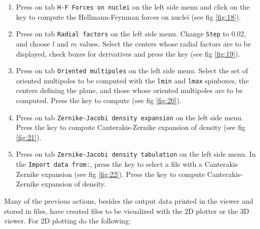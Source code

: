 \documentclass[a4paper,10pt]{article}
\begin{document}
\begin{enumerate}
\item Press on tab \texttt{H-F Forces on nuclei} on the left side menu and
click on the \exec key to compute the Hellmann-Feynman forces on nuclei (see fig
\ref{fig:18}).

\item Press on tab \texttt{Radial factors} on the left side menu. Change \texttt{Step}
to 0.02, and choose $l$ and $m$ values.
Select the centers whose radial factors are to be displayed, check
boxes for derivatives and press the \exec key (see fig \ref{fig:19}).

\item Press on tab \texttt{Oriented multipoles} on the left side menu. 
Select the set of oriented multipoles to be computed with the \texttt{lmin} and
\texttt{lmax} spinboxes, the centers defining the plane, and those whose oriented multipoles are to be 
computed. Press the \exec key to compute (see fig \ref{fig:20}).

\item Press on tab \texttt{Zernike-Jacobi density expansion} on the left side menu.
Press the \exec key to compute Canterakis-Zernike expansion of density (see fig \ref{fig:21}).

\item Press on tab \texttt{Zernike-Jacobi density tabulation} on the left side menu.
In the \texttt{Import data from:}, press the \teclapuntos key to select a file with 
a Canterakis Zernike expansion (see fig \ref{fig:22}).
Press the \exec key to compute Canterakis-Zernike expansion of density.

\end{enumerate}

Many of the previous actions, besides the output data printed in the viewer and
stored in \out{ } files, have created files to be visualized with the 2D plotter
or the 3D viewer. For 2D plotting do the following:
\end{document}
